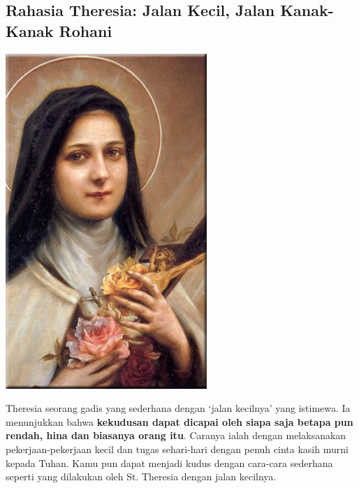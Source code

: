 \subsection*{Rahasia Theresia: Jalan Kecil, Jalan Kanak-Kanak Rohani}

\begin{floatingfigure}[l]{2.75cm}
\begin{center}
\includegraphics[scale=0.275]{theresia-3.jpg}
\end{center}
\end{floatingfigure}
Theresia seorang gadis yang sederhana dengan `jalan kecilnya' yang istimewa.  Ia menunjukkan bahwa \textbf{kekudusan dapat dicapai oleh siapa saja betapa pun rendah, hina dan biasanya orang itu}. Caranya ialah dengan melaksanakan pekerjaan-pekerjaan kecil dan tugas sehari-hari dengan penuh cinta kasih murni kepada Tuhan. Kamu pun dapat menjadi kudus dengan cara-cara sederhana seperti yang dilakukan oleh St. Theresia dengan jalan kecilnya.

